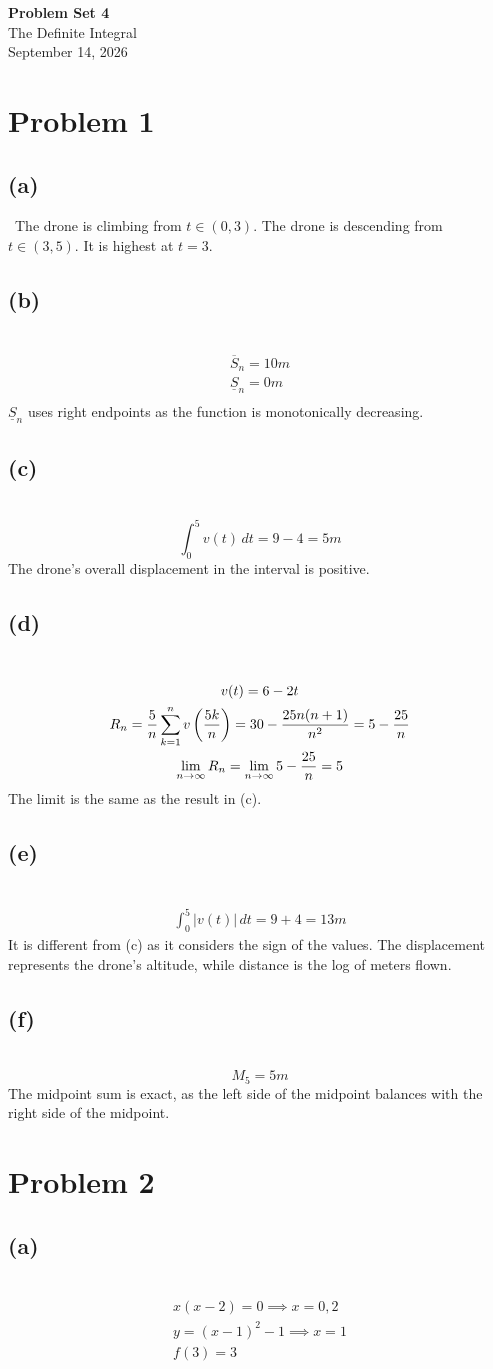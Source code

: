 \documentclass[12pt]{article}
\newcommand*{\paren}[1]{\ensuremath\left(#1\right)}
\newcommand{\vem}{\vspace{0.5em}}
\newcommand{\problem}[1]{\section{Problem #1}}
\newcommand{\subproblem}[1]{\subsection{(#1)} \,}
\begin{document}
\vspace*{0cm}

\begin{center}
    {\Large \bfseries Problem Set 4} \\[0.5cm]
    {\large The Definite Integral} \\[0.35cm]
    {\normalsize September 14, 2026}
\end{center}


\problem{1}

\subproblem{a}
The drone is climbing from $t\in (0,3)$. The drone is descending from $t\in (3,5)$. It is highest at $t=3$. \vem

\subproblem{b}
\begin{gather*}
    \overline{S}_n=10m\\
    \underline{S}_n=0m\\
\end{gather*}
$\underline{S}_n$ uses right endpoints as the function is monotonically decreasing.\vem

\subproblem{c}
\[
\int_0^5 v(t) \, dt=9-4=5m
\]
The drone's overall displacement in the interval is positive.\vem

\subproblem{d}
\begin{gather*}
    v(t)=6-2t\\
    R_n=\frac{5}{n} \sum_{k=1}^nv\paren{\frac{5k}{n}}=30-\frac{25n(n+1)}{n^2}=5-\frac{25}{n}\\
    \lim_{n \to \infty} R_n=\lim_{n\to \infty} 5-\frac{25}{n}=5
\end{gather*}
The limit is the same as the result in (c).\vem

\subproblem{e}
\begin{gather*}
    \int_0^5 |v(t)| \, dt =9+4=13m
\end{gather*}
It is different from (c) as it considers the sign of the values. The displacement represents the drone's altitude, while distance is the log of meters flown. \vem

\subproblem{f}
\[
M_5=5m
\]
The midpoint sum is exact, as the left side of the midpoint balances with the right side of the midpoint.

\problem{2}

\subproblem{a}
\begin{gather*}
    x(x-2)=0 \implies x=0,2\\
    y=(x-1)^2-1\implies x=1\\
    f(3)=3
\end{gather*}
\end{document}

